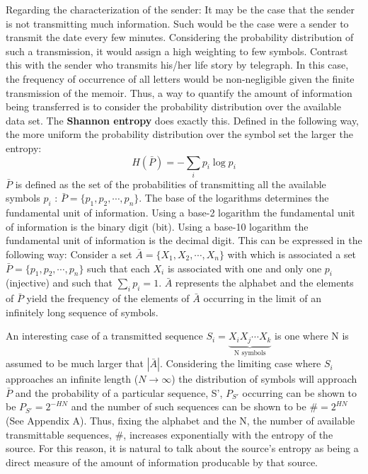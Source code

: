 \documentclass[letterpaper,twoside,10pt]{article}
\begin{document}
Regarding the characterization of the sender: It may be the case that the sender is not transmitting much information. Such would be the case were a sender to transmit the date every few minutes. Considering the probability distribution of such a transmission, it would assign a high weighting to few symbols. Contrast this with the sender who transmits his/her life story by telegraph. In this case, the frequency of occurrence of all letters would be non-negligible given the finite transmission of the memoir. Thus, a way to quantify the amount of information being transferred is to consider the probability distribution over the available data set. The \textbf{Shannon entropy} does exactly this. Defined in the following way, the more uniform the probability distribution over the symbol set the larger the entropy: \begin{equation} H(\bar P) = -\sum_i p_i \log{p_i} \end{equation} $\bar P$ is defined as the set of the probabilities of transmitting all the available symbols $p_i$ : $\bar P = \{p_1,p_2,\cdots,p_n\}$. The base of the logarithms determines the fundamental unit of information. Using a base-2 logarithm the fundamental unit of information is the binary digit (bit). Using a base-10 logarithm the fundamental unit of information is the decimal digit. This can be expressed in the following way: Consider a set $ \bar A = \{X_1,X_2,\cdots,X_n\}$ with which is associated a set $ \bar P = \{p_1,p_2,\cdots,p_n\} $ such that each $X_i$ is associated with one and only one $p_i$ (injective) and such that $\sum_i p_i = 1$. $\bar A$ represents the alphabet and the elements of $\bar P$ yield the frequency of the elements of $\bar A$ occurring in the limit of an infinitely long sequence of symbols. 

An interesting case of a transmitted sequence $ S_i = \underbrace{X_i X_j \cdots X_k}_{\text{N symbols}} $ is one where N is assumed to be much larger that $|\bar A|$. Considering the limiting case where $S_i$ approaches an infinite length ($N \to\infty$) the distribution of symbols will approach $\bar P$ and the probability of a particular sequence, S', $P_{S'}$ occurring can be shown to be $P_{S'}=2^{-HN}$ and the number of such sequences can be shown to be $\# = 2^{HN}$ (See Appendix A).  Thus, fixing the alphabet and the N, the number of available transmittable sequences, $\#$, increases exponentially with the entropy of the source. For this reason, it is natural to talk about the source's entropy as being a direct measure of the amount of information producable by that source.
\end{document}
